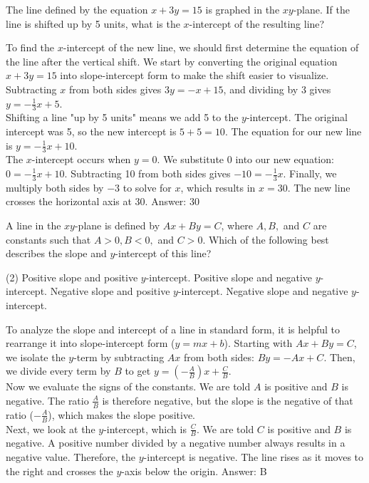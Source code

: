 \documentclass[11pt,paper=a4,answers]{exam}
\begin{document}
\begin{questions}
\question
The line defined by the equation $x + 3y = 15$ is graphed in the $xy$-plane. If the line is shifted up by 5 units, what is the $x$-intercept of the resulting line?

\begin{solution}
To find the $x$-intercept of the new line, we should first determine the equation of the line after the vertical shift. We start by converting the original equation $x + 3y = 15$ into slope-intercept form to make the shift easier to visualize. Subtracting $x$ from both sides gives $3y = -x + 15$, and dividing by 3 gives $y = -\frac{1}{3}x + 5$.
\\[10pt]
Shifting a line "up by 5 units" means we add 5 to the $y$-intercept. The original intercept was 5, so the new intercept is $5 + 5 = 10$. The equation for our new line is $y = -\frac{1}{3}x + 10$.
\\[10pt]
The $x$-intercept occurs when $y = 0$. We substitute 0 into our new equation: $0 = -\frac{1}{3}x + 10$. Subtracting 10 from both sides gives $-10 = -\frac{1}{3}x$. Finally, we multiply both sides by $-3$ to solve for $x$, which results in $x = 30$. The new line crosses the horizontal axis at 30.
\vspace{15pt}
Answer: \colorbox{yellow!100}{30}
\end{solution}

\question
A line in the $xy$-plane is defined by $Ax + By = C$, where $A, B,$ and $C$ are constants such that $A > 0, B < 0,$ and $C > 0$. Which of the following best describes the slope and $y$-intercept of this line?
\begin{tasks}(2)
    \task Positive slope and positive $y$-intercept.
    \task Positive slope and negative $y$-intercept.
    \task Negative slope and positive $y$-intercept.
    \task Negative slope and negative $y$-intercept.
\end{tasks}

\begin{solution}
To analyze the slope and intercept of a line in standard form, it is helpful to rearrange it into slope-intercept form ($y = mx + b$). Starting with $Ax + By = C$, we isolate the $y$-term by subtracting $Ax$ from both sides: $By = -Ax + C$. Then, we divide every term by $B$ to get $y = (-\frac{A}{B})x + \frac{C}{B}$.
\\[10pt]
Now we evaluate the signs of the constants. We are told $A$ is positive and $B$ is negative. The ratio $\frac{A}{B}$ is therefore negative, but the slope is the negative of that ratio ($-\frac{A}{B}$), which makes the slope positive.
\\[10pt]
Next, we look at the $y$-intercept, which is $\frac{C}{B}$. We are told $C$ is positive and $B$ is negative. A positive number divided by a negative number always results in a negative value. Therefore, the $y$-intercept is negative. The line rises as it moves to the right and crosses the $y$-axis below the origin.
\vspace{15pt}
Answer: \colorbox{yellow!100}{B}
\end{solution}


\end{questions}
\end{document}
